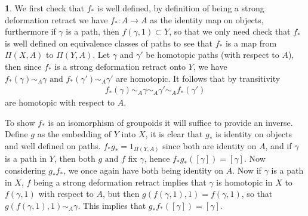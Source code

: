 \documentclass[10.5pt]{article}
\theoremstyle{definition}
\newtheorem{pb}{}
\newcommand{\tand}{\text{ and }}
\begin{document}
    \begin{pb}
        We first check that \(f_*\) is well defined, by definition of being a strong deformation retract we have \(f_*: A \to A\) as the identity map on objects, furthermore if \(\gamma\) is a path, then
        \(f(\gamma,1)\subset Y\), so that we only need check that \(f_*\) is well defined on equivalence classes of paths to see that \(f_*\) is a map from \(\Pi(X,A)\) to \(\Pi(Y,A)\).
        Let \(\gamma\) and \(\gamma'\) be homotopic paths (with respect to \(A\)), then since \(f_*\) is a strong deformation retract onto \(Y\), we have
        \(f_*(\gamma) \sim_A \gamma \tand f_*(\gamma') \sim_A \gamma'\) are homotopic. It follows that by transitivity
        \begin{align*}
            f_*(\gamma) \sim_A \gamma \sim_A \gamma' \sim_A f_*(\gamma')
        \end{align*}
        are homotopic with respect to \(A\).

        To show \(f_*\) is an isomorphism of groupoids it will suffice to provide an inverse. Define \(g\) as the embedding of \(Y\) into \(X\), it is clear that \(g_*\) is identity on objects and
        well defined on paths. \(f_*g_* = 1_{\Pi(Y,A)}\) since both are identity on \(A\), and if \(\gamma\) is a path in \(Y\), then both \(g \tand f\) fix \(\gamma\), hence
        \(f_*g_*([\gamma]) = [\gamma]\). Now considering \(g_*f_*\), we once again have both being identity on \(A\). Now if \(\gamma\) is a path in \(X\), \(f\) being a strong
        deformation retract implies that \(\gamma\) is homotopic in \(X\) to \(f(\gamma,1)\) with respect to \(A\), but then \(g(f(\gamma,1),1) = f(\gamma,1)\), so that
        \(g(f(\gamma,1),1) \sim_A \gamma\). This implies that \(g_*f_*([\gamma]) = [\gamma]\).
    \end{pb}
\end{document}
